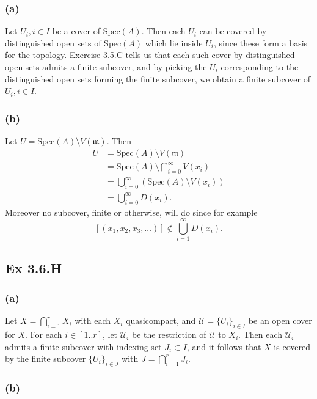 \documentclass{article}
\theoremstyle{definition}
\newcommand{\Spec}{\text{Spec}}
\begin{document}
\subsubsection*{(a)}

Let $U_i, i \in I$ be a cover of $\Spec(A)$. Then each $U_i$ can be covered by
distinguished open sets of $\Spec(A)$ which lie inside $U_i$, since these form
a basis for the topology. Exercise 3.5.C tells us that each such cover by
distinguished open sets admits a finite subcover, and by picking the $U_i$
corresponding to the distinguished open sets forming the finite subcover, we
obtain a finite subcover of $U_i, i \in I$.

\subsubsection*{(b)}

Let $U = \Spec(A) \setminus V(\mathfrak{m})$. Then
\begin{align*}
	U
	&=
	\Spec(A) \setminus V(\mathfrak{m}) \\
	&=
	\Spec(A) \setminus \bigcap_{i = 0}^{\infty} V(x_i) \\
	&=
	\bigcup_{i = 0}^{\infty} \left(\Spec(A) \setminus V(x_i)\right) \\
	&=
	\bigcup_{i = 0}^{\infty} D(x_i).
\end{align*}
Moreover no subcover, finite or otherwise, will do since for example 
\[
	[(x_1, x_2, x_3, \ldots)]
	\not \in
	\bigcup_{i = 1}^{\infty} D(x_i).
\] 


\subsection*{Ex 3.6.H}

\subsubsection*{(a)}

Let $X = \bigcap_{i = 1}^{r} X_i$ with each $X_i$ quasicompact, and
$\mathcal{U} = \{U_i\}_{i \in I}$ be an open cover for $X$. For each $i \in
[1..r]$, let $\mathcal{U}_i$ be the restriction of $\mathcal{U}$ to $X_i$. Then
each $\mathcal{U}_i$ admits a finite subcover with indexing set $J_i \subset
I$, and it follows that $X$ is covered by the finite subcover $\{U_i\}_{i \in
J}$ with $J = \bigcap_{i = 1}^{r} J_i$.

\subsubsection*{(b)}
\end{document}
